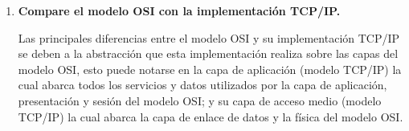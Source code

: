 \documentclass[a4paper,10pt]{article}
\begin{document}
\begin{enumerate}
	\item \textbf{Compare el modelo OSI con la implementación TCP/IP.}
	
	Las principales diferencias entre el modelo OSI y su implementación TCP/IP se deben a la abstracción que esta implementación realiza sobre las capas del modelo OSI, esto puede notarse en la capa de aplicación (modelo TCP/IP) la cual abarca todos los servicios y datos utilizados por la capa de aplicación, presentación y sesión del modelo OSI; y su capa de acceso medio (modelo TCP/IP) la cual abarca la capa de enlace de datos y la física del modelo OSI. \\
	
\end{enumerate}
\end{document}
